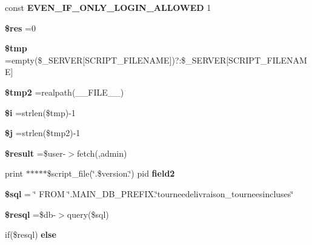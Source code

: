 \begin{DoxyCompactItemize}
const {\bfseries E\+V\+E\+N\+\_\+\+I\+F\+\_\+\+O\+N\+L\+Y\+\_\+\+L\+O\+G\+I\+N\+\_\+\+A\+L\+L\+O\+W\+ED} 1
\item 
\mbox{\label{tourneedelivraison__tourneesincluses_8php_a49a8a4009b02e49717caa88b128affc5}} 
{\bfseries \$res} =0
\item 
\mbox{\label{tourneedelivraison__tourneesincluses_8php_a57024d47cf8348153f5fdda16f8fefa9}} 
{\bfseries \$tmp} =empty(\$\+\_\+\+S\+E\+R\+V\+ER\mbox{[}\textquotesingle{}S\+C\+R\+I\+P\+T\+\_\+\+F\+I\+L\+E\+N\+A\+ME\textquotesingle{}\mbox{]})?\textquotesingle{}\textquotesingle{}\+:\$\+\_\+\+S\+E\+R\+V\+ER\mbox{[}\textquotesingle{}S\+C\+R\+I\+P\+T\+\_\+\+F\+I\+L\+E\+N\+A\+ME\textquotesingle{}\mbox{]}
\item 
\mbox{\label{tourneedelivraison__tourneesincluses_8php_aed9bcb6730d1510376ce80e32bd9504d}} 
{\bfseries \$tmp2} =realpath(\+\_\+\+\_\+\+F\+I\+L\+E\+\_\+\+\_\+)
\item 
\mbox{\label{tourneedelivraison__tourneesincluses_8php_a83018d9153d17d91fbcf3bc10158d34f}} 
{\bfseries \$i} =strlen(\$tmp)-\/1
\item 
\mbox{\label{tourneedelivraison__tourneesincluses_8php_a6f16db779ef3ccea921b277b5dc245d1}} 
{\bfseries \$j} =strlen(\$tmp2)-\/1
\item 
\mbox{\label{tourneedelivraison__tourneesincluses_8php_a112ef069ddc0454086e3d1e6d8d55d07}} 
{\bfseries \$result} =\$user-\/$>$fetch(\textquotesingle{}\textquotesingle{},\textquotesingle{}admin\textquotesingle{})
\item 
\mbox{\label{tourneedelivraison__tourneesincluses_8php_af9edfce80596a171cfb2884ba7ad01df}} 
print $\ast$$\ast$$\ast$$\ast$$\ast$\$script\+\_\+file(\char`\"{}.\$version.\char`\"{}) pid {\bfseries field2}
\item 
\mbox{\label{tourneedelivraison__tourneesincluses_8php_a047170d6020a882807665812a27e2525}} 
{\bfseries \$sql} = \char`\"{} F\+R\+OM \char`\"{}.M\+A\+I\+N\+\_\+\+D\+B\+\_\+\+P\+R\+E\+F\+I\+X.\char`\"{}tourneedelivraison\+\_\+tourneesincluses\char`\"{}
\item 
\mbox{\label{tourneedelivraison__tourneesincluses_8php_a6adc5ef389ab51c21dee69262018d615}} 
{\bfseries \$resql} =\$db-\/$>$query(\$sql)
\item 
if(\$resql) {\bfseries else}
\end{DoxyCompactItemize}


